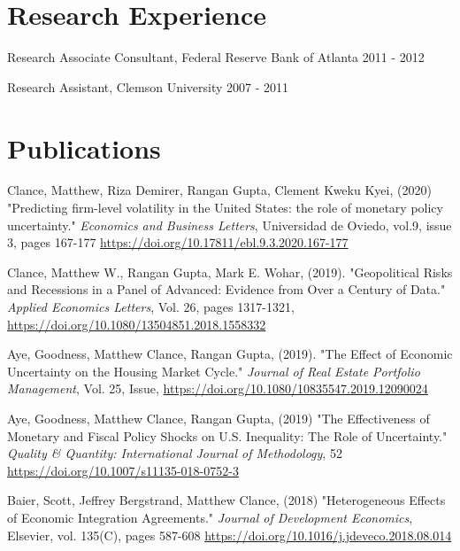 \documentclass[margin,line]{res}                          %
\newenvironment{list1}{
  \begin{list}{\ding{113}}{%
      \setlength{\itemsep}{0.4em}
      \setlength{\parsep}{0in} \setlength{\parskip}{0in}
      \setlength{\topsep}{0in} \setlength{\partopsep}{0in} 
      \setlength{\leftmargin}{0.17in}}}{\end{list}}
\begin{document}
\begin{resume}
\section{\sc Research Experience}
\begin{list1}
\item[] Research Associate Consultant, Federal Reserve Bank of Atlanta \hfill 2011 - 2012
\item[] Research Assistant, Clemson University \hfill 2007 - 2011 
\end{list1}

\section{\sc Publications}
\begin{list1}
\item[] 
\item[] 
\item[]  
\item[]  
\item[]  
\item[] 
\item[] 
\item[] 
\item[] 
\item[] 
\item[] Clance, Matthew, Riza Demirer, Rangan Gupta, Clement Kweku Kyei, (2020) "Predicting firm-level volatility in the United States: the role of monetary policy uncertainty." \textit{Economics and Business Letters}, Universidad de Oviedo, vol.9, issue 3, pages 167-177 \url{https://doi.org/10.17811/ebl.9.3.2020.167-177}
\item[] Clance, Matthew W., Rangan Gupta, Mark E. Wohar, (2019). "Geopolitical Risks and Recessions in a Panel of Advanced: Evidence from Over a Century of Data." \textit{Applied Economics Letters}, Vol. 26, pages 1317-1321, \url{https://doi.org/10.1080/13504851.2018.1558332}
\item[] Aye, Goodness, Matthew Clance, Rangan Gupta, (2019). "The Effect of Economic Uncertainty on the Housing Market Cycle." \textit{Journal of Real Estate Portfolio Management}, Vol. 25, Issue, \url{https://doi.org/10.1080/10835547.2019.12090024}
\item[] Aye, Goodness, Matthew Clance, Rangan Gupta, (2019) "The Effectiveness of Monetary and Fiscal Policy Shocks on U.S. Inequality: The Role of Uncertainty." \textit{Quality \& Quantity: International Journal of Methodology}, 52 \url{https://doi.org/10.1007/s11135-018-0752-3}
\item[] Baier, Scott, Jeffrey Bergstrand, Matthew Clance, (2018) "Heterogeneous Effects of Economic Integration Agreements." \textit{Journal of Development Economics}, Elsevier, vol. 135(C), pages 587-608  \url{https://doi.org/10.1016/j.jdeveco.2018.08.014}
\end{list1}


\end{resume}
\end{document}
